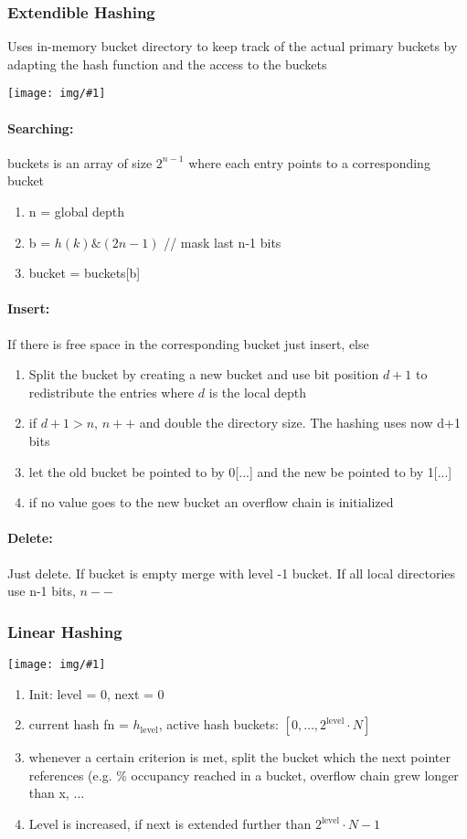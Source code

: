 \documentclass[a4paper]{article}
\newcommand{\img}[1]{\begin{center}
    \texttt{[image: img/\#1]}
\end{center} }
\begin{document}
\begin{twocolumn}
 \subsubsection{Extendible Hashing}
Uses in-memory bucket directory to keep track of the actual primary buckets by adapting the hash function and the access to the buckets

\img{extendible_hashing.png}

\paragraph{Searching:} buckets is an array of size $2^{n-1}$ where each entry points to a corresponding bucket
\begin{enumerate}
	\item n = global depth
	\item b = $h(k) \& (2n-1)$ // mask last n-1 bits
	\item bucket = buckets[b]
\end{enumerate}

\paragraph{Insert:} If there is free space in the corresponding bucket just insert, else 
\begin{enumerate}
	\item Split the bucket by creating a new bucket and use bit position $d+1$ to redistribute the entries where $d$ is the local depth
	\item if $d+1 > n$, $n++$ and double the directory size. The hashing uses now d+1 bits
	\item let the old bucket be pointed to by 0[...] and the new be pointed to by 1[...]
	\item if no value goes to the new bucket an overflow chain is initialized
\end{enumerate}

\paragraph{Delete:} Just delete. If bucket is empty merge with level -1 bucket. If all local directories use n-1 bits, $n--$

\subsubsection{Linear Hashing}
\img{linear_hashing.png}
\begin{enumerate}
	\item Init: level = 0, next = 0
	\item current hash fn = $h_{\text{level}}$, active hash buckets: $[0,\dots, 2^{\text{level}} \cdot N]$
	\item whenever a certain criterion is met, split the bucket which the next pointer references (e.g. \% occupancy reached in a bucket, overflow chain grew longer than x, $\dots$
	\item Level is increased, if next is extended further than $2^{\text{level}} \cdot N -1 $
\end{enumerate}


\end{twocolumn}
\end{document}
